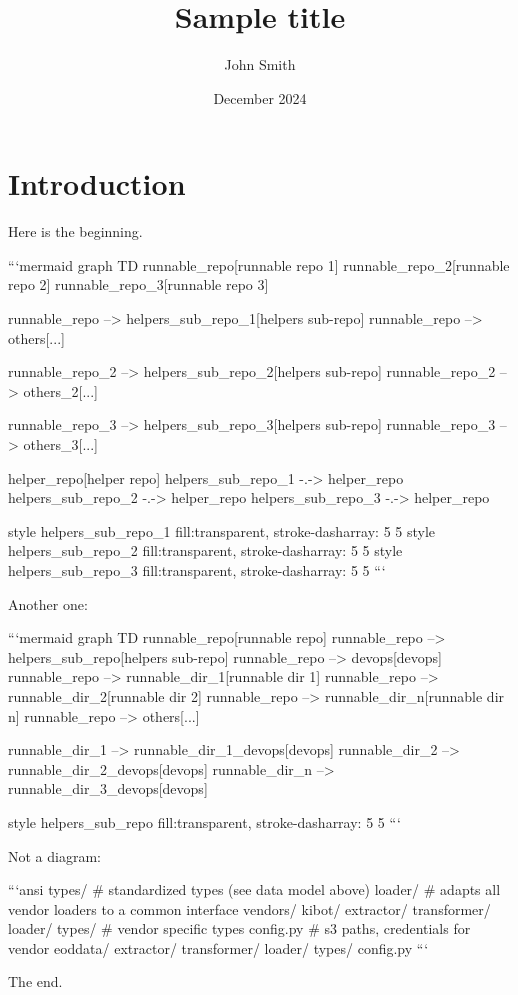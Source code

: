 \documentclass{article}
\title{Sample title}
\author{John Smith}
\date{December 2024}
\begin{document}
\maketitle

\section{Introduction}

Here is the beginning.

```mermaid
graph TD
  runnable_repo[runnable repo 1]
  runnable_repo_2[runnable repo 2]
  runnable_repo_3[runnable repo 3]

  runnable_repo --> helpers_sub_repo_1[helpers sub-repo]
  runnable_repo --> others[...]

  runnable_repo_2 --> helpers_sub_repo_2[helpers sub-repo]
  runnable_repo_2 --> others_2[...]

  runnable_repo_3 --> helpers_sub_repo_3[helpers sub-repo]
  runnable_repo_3 --> others_3[...]

  helper_repo[helper repo]
  helpers_sub_repo_1 -.-> helper_repo
  helpers_sub_repo_2 -.-> helper_repo
  helpers_sub_repo_3 -.-> helper_repo

  style helpers_sub_repo_1 fill:transparent, stroke-dasharray: 5 5
  style helpers_sub_repo_2 fill:transparent, stroke-dasharray: 5 5
  style helpers_sub_repo_3 fill:transparent, stroke-dasharray: 5 5
```

Another one:

```mermaid
graph TD
  runnable_repo[runnable repo]
  runnable_repo --> helpers_sub_repo[helpers sub-repo]
  runnable_repo --> devops[devops]
  runnable_repo --> runnable_dir_1[runnable dir 1]
  runnable_repo --> runnable_dir_2[runnable dir 2]
  runnable_repo --> runnable_dir_n[runnable dir n]
  runnable_repo --> others[...]

  runnable_dir_1 --> runnable_dir_1_devops[devops]
  runnable_dir_2 --> runnable_dir_2_devops[devops]
  runnable_dir_n --> runnable_dir_3_devops[devops]

  style helpers_sub_repo fill:transparent, stroke-dasharray: 5 5
```

Not a diagram:

```ansi
types/  # standardized types (see data model above)
loader/  # adapts all vendor loaders to a common interface
vendors/
   kibot/
      extractor/
      transformer/
      loader/
      types/  # vendor specific types
      config.py  # s3 paths, credentials for vendor
   eoddata/
      extractor/
      transformer/
      loader/
      types/
      config.py
```

The end.
\end{document}
